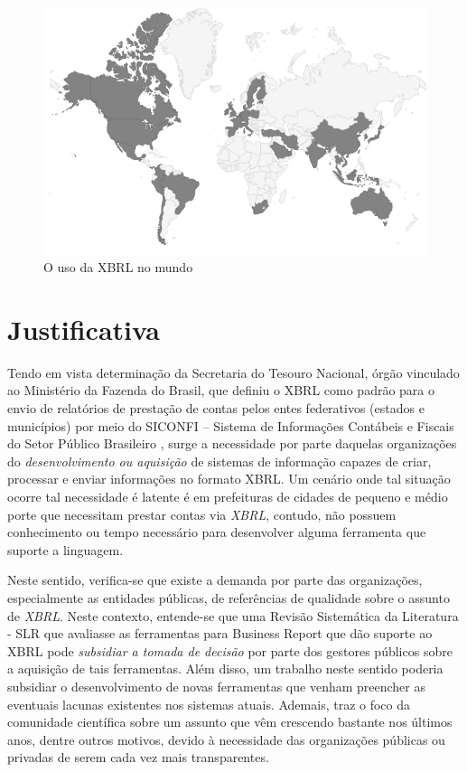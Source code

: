 \documentclass[12pt]{article}
\begin{document}
\begin{figure}[htb]
\centering
\includegraphics[width=.75\textwidth]{../img/world-map.png}
\caption{O uso da XBRL no mundo}
\label{fig:world_map}
\end{figure}

\section{Justificativa}
\label{sec:problema}

Tendo em vista determinação da Secretaria do Tesouro Nacional, órgão
vinculado ao  Ministério da Fazenda do Brasil, que definiu o XBRL como
padrão para o envio de relatórios de prestação de contas pelos entes
federativos (estados e municípios) por meio do SICONFI – Sistema de Informações Contábeis e Fiscais do Setor Público Brasileiro \cite{nt_03_2013}, surge a necessidade por parte
daquelas organizações do \textit{desenvolvimento ou aquisição} de sistemas de
informação capazes de criar, processar e enviar informações no formato
XBRL. Um cenário onde tal situação ocorre tal necessidade é latente é em
prefeituras de cidades de pequeno e médio porte que necessitam prestar contas
via \textit{XBRL}, contudo, não possuem conhecimento ou tempo necessário para desenvolver alguma ferramenta que suporte a linguagem.

Neste sentido, verifica-se que existe a demanda por parte das organizações, especialmente as entidades públicas, de referências de qualidade sobre o assunto de \textit{XBRL}. Neste contexto, entende-se que uma Revisão Sistemática da Literatura - SLR  que avaliasse as ferramentas para Business Report que dão suporte ao XBRL pode \textit{subsidiar a tomada de decisão} por parte dos gestores públicos sobre a aquisição de tais ferramentas. Além disso, um trabalho neste sentido poderia subsidiar o desenvolvimento de novas ferramentas que venham preencher as eventuais lacunas existentes nos sistemas atuais. Ademais, traz o foco da comunidade científica sobre um assunto que vêm crescendo bastante nos últimos anos, dentre outros motivos, devido à necessidade das organizações públicas ou privadas de serem cada vez mais transparentes.
\end{document}
